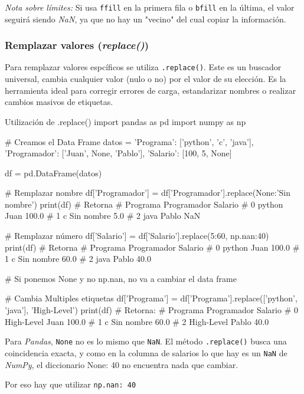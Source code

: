 \begin{nota}
\textit{Nota sobre límites:} Si usa \texttt{ffill} en la primera fila o \texttt{bfill} en la última, el valor seguirá siendo \textit{NaN}, ya que no hay un "vecino" del cual copiar la información.
\end{nota}



\subsubsection{Remplazar valores (\textit{replace()})}

Para remplazar valores espcíficos se utiliza \texttt{.replace()}. Este es un buscador universal, cambia cualquier valor (nulo o no) por el valor de su elección. Es la herramienta ideal para corregir errores de carga, estandarizar nombres o realizar cambios masivos de etiquetas.

\begin{pycode}{Utilización de .replace()}
import pandas as pd
import numpy as np

# Creamos el Data Frame
datos = {
    'Programa': ['python', 'c', 'java'],
    'Programador': ['Juan', None, 'Pablo'],
    'Salario': [100, 5, None]
}    

df = pd.DataFrame(datos)

# Remplazar nombre
df['Programador'] = df['Programador'].replace({None:'Sin nombre'})
print(df) # Retorna
#   Programa Programador  Salario
# 0   python        Juan    100.0
# 1        c  Sin nombre      5.0
# 2     java       Pablo      NaN

# Remplazar número
df['Salario'] = df['Salario'].replace({5:60, np.nan:40})
print(df) # Retorna
#   Programa Programador  Salario
# 0   python        Juan    100.0
# 1        c  Sin nombre     60.0
# 2     java       Pablo     40.0

# Si ponemos None y no np.nan, no va a cambiar el data frame

# Cambia Multiples etiquetas
df['Programa'] = df['Programa'].replace(['python', 'java'], 'High-Level')
print(df) # Retorna:
#      Programa Programador  Salario
# 0  High-Level        Juan    100.0
# 1           c  Sin nombre     60.0
# 2  High-Level       Pablo     40.0
\end{pycode}

\begin{nota}
    Para \textit{Pandas}, \texttt{None} no es lo mismo que \texttt{NaN}. El método \texttt{.replace()} busca una coincidencia exacta, y como en la columna de salarios lo que hay es un \texttt{NaN} de \textit{NumPy}, el diccionario {None: 40} no encuentra nada que cambiar.

    Por eso hay que utilizar \texttt{np.nan: 40}
\end{nota}





